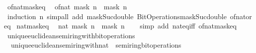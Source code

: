 \begin{isabellebody}
\endisatagproof
{\isafoldproof}%
%
\isadelimproof
\isanewline
%
\endisadelimproof
\isanewline
{}\isamarkupfalse%
\ of{\isacharunderscore}{\kern0pt}nat{\isacharunderscore}{\kern0pt}mask{\isacharunderscore}{\kern0pt}eq{\isacharcolon}{\kern0pt}\isanewline
\ \ {\isacartoucheopen}of{\isacharunderscore}{\kern0pt}nat\ {\isacharparenleft}{\kern0pt}mask\ n{\isacharparenright}{\kern0pt}\ {\isacharequal}{\kern0pt}\ mask\ n{\isacartoucheclose}\isanewline
%
\isadelimproof
\ \ %
\endisadelimproof
%
\isatagproof
{}\isamarkupfalse%
\ {\isacharparenleft}{\kern0pt}induction\ n{\isacharparenright}{\kern0pt}\ {\isacharparenleft}{\kern0pt}simp{\isacharunderscore}{\kern0pt}all\ add{\isacharcolon}{\kern0pt}\ mask{\isacharunderscore}{\kern0pt}Suc{\isacharunderscore}{\kern0pt}double\ Bit{\isacharunderscore}{\kern0pt}Operations{\isachardot}{\kern0pt}mask{\isacharunderscore}{\kern0pt}Suc{\isacharunderscore}{\kern0pt}double\ of{\isacharunderscore}{\kern0pt}nat{\isacharunderscore}{\kern0pt}or{\isacharunderscore}{\kern0pt}eq{\isacharparenright}{\kern0pt}%
\endisatagproof
{\isafoldproof}%
%
\isadelimproof
\isanewline
%
\endisadelimproof
\isanewline
{}\isamarkupfalse%
\isanewline
\isanewline
{}\isamarkupfalse%
\ nat{\isacharunderscore}{\kern0pt}mask{\isacharunderscore}{\kern0pt}eq{\isacharcolon}{\kern0pt}\isanewline
\ \ {\isacartoucheopen}nat\ {\isacharparenleft}{\kern0pt}mask\ n{\isacharparenright}{\kern0pt}\ {\isacharequal}{\kern0pt}\ mask\ n{\isacartoucheclose}\isanewline
%
\isadelimproof
\ \ %
\endisadelimproof
%
\isatagproof
{}\isamarkupfalse%
\ {\isacharparenleft}{\kern0pt}simp\ add{\isacharcolon}{\kern0pt}\ nat{\isacharunderscore}{\kern0pt}eq{\isacharunderscore}{\kern0pt}iff\ of{\isacharunderscore}{\kern0pt}nat{\isacharunderscore}{\kern0pt}mask{\isacharunderscore}{\kern0pt}eq{\isacharparenright}{\kern0pt}%
\endisatagproof
{\isafoldproof}%
%
\isadelimproof
%
\endisadelimproof
%
\isadelimdocument
%
\endisadelimdocument
%
\isatagdocument
%
\isamarkuptrue%
%
\endisatagdocument
{\isafolddocument}%
%
\isadelimdocument
%
\endisadelimdocument
{}\isamarkupfalse%
\ unique{\isacharunderscore}{\kern0pt}euclidean{\isacharunderscore}{\kern0pt}semiring{\isacharunderscore}{\kern0pt}with{\isacharunderscore}{\kern0pt}bit{\isacharunderscore}{\kern0pt}operations\ {\isacharequal}{\kern0pt}\isanewline
\ \ unique{\isacharunderscore}{\kern0pt}euclidean{\isacharunderscore}{\kern0pt}semiring{\isacharunderscore}{\kern0pt}with{\isacharunderscore}{\kern0pt}nat\ {\isacharplus}{\kern0pt}\ semiring{\isacharunderscore}{\kern0pt}bit{\isacharunderscore}{\kern0pt}operations\isanewline

\end{isabellebody}

